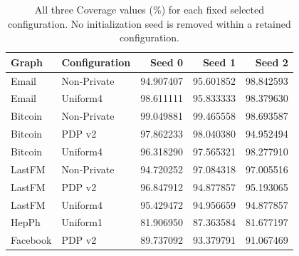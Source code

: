 \begin{table}[htbp]
\centering\small
\caption{All three Coverage values (\%) for each fixed selected configuration. No initialization seed is removed within a retained configuration.}\label{tab:frozenseeds}
\begin{tabular}{llrrr}
\toprule
Graph & Configuration & Seed 0 & Seed 1 & Seed 2\\ \midrule
Email & Non-Private & 94.907407 & 95.601852 & 98.842593 \\
Email & Uniform4 & 98.611111 & 95.833333 & 98.379630 \\
Bitcoin & Non-Private & 99.049881 & 99.465558 & 98.693587 \\
Bitcoin & PDP v2 & 97.862233 & 98.040380 & 94.952494 \\
Bitcoin & Uniform4 & 96.318290 & 97.565321 & 98.277910 \\
LastFM & Non-Private & 94.720252 & 97.084318 & 97.005516 \\
LastFM & PDP v2 & 96.847912 & 94.877857 & 95.193065 \\
LastFM & Uniform4 & 95.429472 & 94.956659 & 94.877857 \\
HepPh & Uniform1 & 81.906950 & 87.363584 & 81.677197 \\
Facebook & PDP v2 & 89.737092 & 93.379791 & 91.067469 \\
\bottomrule\end{tabular}
\end{table}
